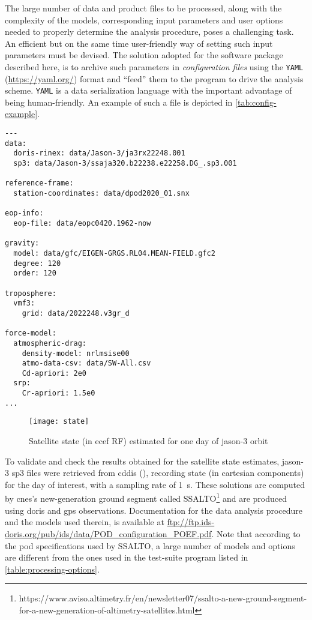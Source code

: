 The large number of data and product files to be processed, along with the complexity of 
the models, corresponding input parameters and user options needed to properly determine 
the analysis procedure, poses a challenging task. An efficient but on the same time 
user-friendly way of setting such input parameters must be devised. The solution adopted 
for the software package described here, is to archive such parameters in \emph{configuration files} 
using the \texttt{YAML} (\url{https://yaml.org/}) format and ``feed'' them to the 
program to drive the analysis scheme. \texttt{YAML} is a data serialization
language with the important advantage of being human-friendly. An example of such 
a file is depicted in \autoref{tab:config-example}.

\begin{adjustbox}{center, max width=\linewidth , fbox=0.5pt, captionbelow={Configuration file example.}, float=table}
\begin{BVerbatim}
---
data:
  doris-rinex: data/Jason-3/ja3rx22248.001
  sp3: data/Jason-3/ssaja320.b22238.e22258.DG_.sp3.001

reference-frame:
  station-coordinates: data/dpod2020_01.snx

eop-info:
  eop-file: data/eopc0420.1962-now

gravity:
  model: data/gfc/EIGEN-GRGS.RL04.MEAN-FIELD.gfc2
  degree: 120
  order: 120

troposphere:
  vmf3:
    grid: data/2022248.v3gr_d

force-model:
  atmospheric-drag:
    density-model: nrlmsise00
    atmo-data-csv: data/SW-All.csv
    Cd-apriori: 2e0
  srp:
    Cr-apriori: 1.5e0
...
\end{BVerbatim}
\label{tab:config-example}
\end{adjustbox}

\begin{figure}
    \centering
    \texttt{[image: state]}
    \caption{Satellite state (in \gls{ecef} RF) estimated for one day of \gls{jason}-3 orbit}
    \label{fig:state}
\end{figure}

To validate and check the results obtained for the satellite state estimates, 
\gls{jason}-3 sp3 files were retrieved from \gls{cddis} (\cite{Noll2010}), recording 
state (in cartesian components) for the day of interest, with a sampling rate of 
\SI{1}{\second}. These solutions are computed by \gls{cnes}'s new-generation ground segment 
called SSALTO\footnote{https://www.aviso.altimetry.fr/en/newsletter07/ssalto-a-new-ground-segment-for-a-new-generation-of-altimetry-satellites.html} 
and are produced using \gls{doris} and \gls{gps} observations. Documentation 
for the data analysis procedure and the models used therein, is available at 
\url{ftp://ftp.ids-doris.org/pub/ids/data/POD_configuration_POEF.pdf}. Note that 
according to the \gls{pod} specifications used by SSALTO, a large number of models 
and options are different from the ones used in the test-suite program listed in 
\autoref{table:processing-options}.


